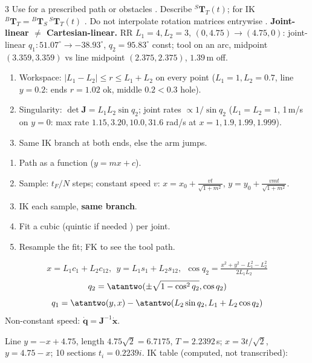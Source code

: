 \begin{multicols}{3}
Use for a prescribed path or obstacles . Describe ${}^S\mathbf T_T(t)$; for IK ${}^B\mathbf T_T={}^B\mathbf T_S\,{}^S\mathbf T_T(t)$ \added. Do not interpolate rotation matrices entrywise .
\textbf{Joint-linear $\ne$ Cartesian-linear.} RR $L_1{=}4,L_2{=}3$, $(0,4.75)\to(4.75,0)$: joint-linear $q_1:51.07^\circ\to-38.93^\circ$, $q_2=95.83^\circ$ const; tool on an arc, midpoint $(3.359,3.359)$ vs line midpoint $(2.375,2.375)$, $1.39$\,m off. \chk
\begin{recipe}
\begin{enumerate}
\item Workspace: $|L_1-L_2|\le r\le L_1+L_2$ on every point ($L_1{=}1,L_2{=}0.7$, line $y=0.2$: ends $r{=}1.02$ ok, middle $0.2<0.3$ hole). \chk
\item Singularity: $\det\mathbf J=L_1L_2\sin q_2$; joint rates $\propto1/\sin q_2$ ($L_1{=}L_2{=}1$, 1\,m/s on $y{=}0$: max rate $1.15,3.20,10.0,31.6$ rad/s at $x=1,1.9,1.99,1.999$). \chk
\item Same IK branch at both ends, else the arm jumps.
\end{enumerate}
\end{recipe}
\begin{recipe}
\begin{enumerate}
\item Path as a function ($y=mx+c$).
\item Sample: $t_F/N$ steps; constant speed $v$: $x=x_0+\frac{vt}{\sqrt{1+m^2}}$, $y=y_0+\frac{vmt}{\sqrt{1+m^2}}$.
\item IK each sample, \textbf{same branch}.
\item Fit a cubic (quintic if needed ) per joint.
\item Resample the fit; FK to see the tool path.
\end{enumerate}
\end{recipe}
\begin{fbx}[Planar RR FK/IK \pg{56}]
\[x=L_1c_1+L_2c_{12},\ \ y=L_1s_1+L_2s_{12},\ \ \cos q_2=\tfrac{x^2+y^2-L_1^2-L_2^2}{2L_1L_2}\]
\[q_2=\atantwo(\pm\sqrt{1-\cos^2q_2},\cos q_2)\]
\[q_1=\atantwo(y,x)-\atantwo(L_2\sin q_2,L_1+L_2\cos q_2)\]
Non-constant speed: $\dot{\mathbf q}=\mathbf J^{-1}\dot{\mathbf x}$.
\end{fbx}
\begin{worked}[slide pp.\,49--60: $L_1{=}4$, $L_2{=}3$, $(0,4.75)\to(4.75,0)$ at 3\,m/s, branch $q_2>0$]
Line $y=-x+4.75$, length $4.75\sqrt2=6.7175$, $T=2.2392$\,s; $x=3t/\sqrt2$, $y=4.75-x$; 10 sections $t_i=0.2239i$. IK table (computed, not transcribed):\\

\end{worked}
\end{multicols}
